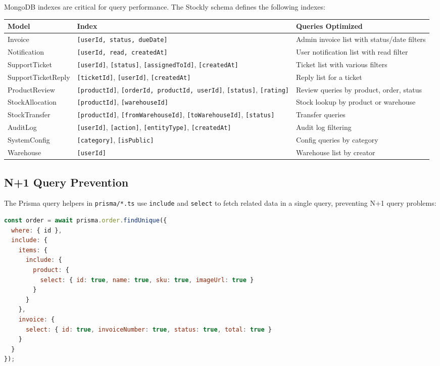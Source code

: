 \documentclass[12pt,a4paper]{report}
\begin{document}
MongoDB indexes are critical for query performance. The Stockly schema defines the following indexes:

\begin{center}
\begin{longtable}{llp{6cm}}
  \toprule
  \textbf{Model} & \textbf{Index} & \textbf{Queries Optimized} \\
  \midrule
  \endhead
  Invoice        & \texttt{[userId, status, dueDate]} & Admin invoice list with status/date filters \\
  Notification   & \texttt{[userId, read, createdAt]} & User notification list with read filter \\
  SupportTicket  & \texttt{[userId]}, \texttt{[status]}, \texttt{[assignedToId]}, \texttt{[createdAt]} & Ticket list with various filters \\
  SupportTicketReply & \texttt{[ticketId]}, \texttt{[userId]}, \texttt{[createdAt]} & Reply list for a ticket \\
  ProductReview  & \texttt{[productId]}, \texttt{[orderId, productId, userId]}, \texttt{[status]}, \texttt{[rating]} & Review queries by product, order, status \\
  StockAllocation & \texttt{[productId]}, \texttt{[warehouseId]} & Stock lookup by product or warehouse \\
  StockTransfer  & \texttt{[productId]}, \texttt{[fromWarehouseId]}, \texttt{[toWarehouseId]}, \texttt{[status]} & Transfer queries \\
  AuditLog       & \texttt{[userId]}, \texttt{[action]}, \texttt{[entityType]}, \texttt{[createdAt]} & Audit log filtering \\
  SystemConfig   & \texttt{[category]}, \texttt{[isPublic]} & Config queries by category \\
  Warehouse      & \texttt{[userId]} & Warehouse list by creator \\
  \bottomrule
\end{longtable}
\end{center}

\subsection{N+1 Query Prevention}

The Prisma query helpers in \texttt{prisma/*.ts} use \texttt{include} and \texttt{select} to fetch related data in a single query, preventing N+1 query problems:

\begin{lstlisting}[language=JavaScript,caption={Efficient order query with includes}]
const order = await prisma.order.findUnique({
  where: { id },
  include: {
    items: {
      include: {
        product: {
          select: { id: true, name: true, sku: true, imageUrl: true }
        }
      }
    },
    invoice: {
      select: { id: true, invoiceNumber: true, status: true, total: true }
    }
  }
});
\end{lstlisting}
\end{document}
